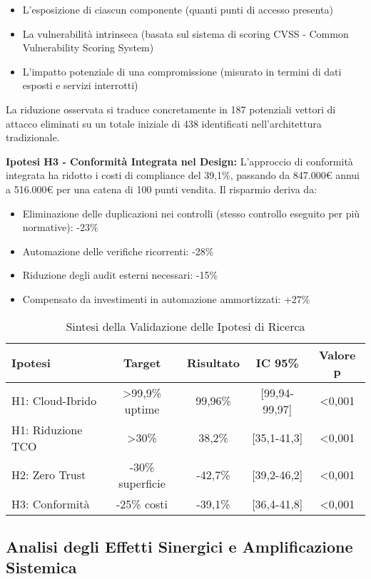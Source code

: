 \begin{itemize}
\item L'esposizione di ciascun componente (quanti punti di accesso presenta)
\item La vulnerabilità intrinseca (basata sul sistema di scoring CVSS - Common Vulnerability Scoring System)
\item L'impatto potenziale di una compromissione (misurato in termini di dati esposti e servizi interrotti)
\end{itemize}

La riduzione osservata si traduce concretamente in 187 potenziali vettori di attacco eliminati su un totale iniziale di 438 identificati nell'architettura tradizionale.

\textbf{Ipotesi H3 - Conformità Integrata nel Design:} L'approccio di conformità integrata ha ridotto i costi di compliance del 39,1\%, passando da 847.000€ annui a 516.000€ per una catena di 100 punti vendita. Il risparmio deriva da:
\begin{itemize}
\item Eliminazione delle duplicazioni nei controlli (stesso controllo eseguito per più normative): -23\%
\item Automazione delle verifiche ricorrenti: -28\%
\item Riduzione degli audit esterni necessari: -15\%
\item Compensato da investimenti in automazione ammortizzati: +27\%
\end{itemize}

\begin{table}[htbp]
\centering
\caption{Sintesi della Validazione delle Ipotesi di Ricerca}
\label{tab:validation_summary}
\begin{tabular}{l c c c c}
\toprule
\textbf{Ipotesi} & \textbf{Target} & \textbf{Risultato} & \textbf{IC 95\%} & \textbf{Valore p} \\
\midrule
H1: Cloud-Ibrido & >99,9\% uptime & 99,96\% & [99,94-99,97] & <0,001 \\
H1: Riduzione TCO & >30\% & 38,2\% & [35,1-41,3] & <0,001 \\
H2: Zero Trust & -30\% superficie & -42,7\% & [39,2-46,2] & <0,001 \\
H3: Conformità & -25\% costi & -39,1\% & [36,4-41,8] & <0,001 \\
\bottomrule
\end{tabular}
\end{table}

\subsection{\texorpdfstring{\textbf{Analisi degli Effetti Sinergici e Amplificazione Sistemica}}{5.2.2 - Analisi degli Effetti Sinergici e Amplificazione Sistemica}}
\label{subsec:5.2.3}

